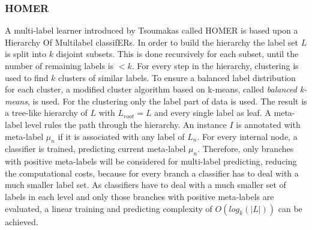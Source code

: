 				\subsubsection{HOMER}
				\label{subsubsec:homer}					
					A multi-label learner introduced by Tsoumakas \etAl \cite{Tsoumakas08} called HOMER is based upon a Hierarchy Of Multilabel classifERs. In order to build the hierarchy the label set $L$ is split into $k$ disjoint subsets. This is done recursively for each subset, until the number of remaining labels is $<k$. For every step in the hierarchy, clustering is used to find $k$ clusters of similar labels. To ensure a balanced label distribution for each cluster, a modified cluster algorithm based on k-means, called \textit{balanced k-means}, is used. For the clustering only the label part of data is used. The result is a tree-like hierarchy of $L$ with $L_{root}=L$ and every single label as leaf. A meta-label level rules the path through the hierarchy. An instance $ I $ is annotated with meta-label $\mu_n$ if it is associated with any label of $L_n$. For every internal node, a classifier is trained, predicting current meta-label $\mu_n$. Therefore, only branches with positive meta-labels will be considered for multi-label predicting, reducing the computational costs, because for every branch a classifier has to deal with a much smaller label set. As classifiers have to deal with a much smaller set of labels in each level and only those branches with positive meta-labels are evaluated, a linear training and predicting complexity of $O(log_k(|L|))$ can be achieved.